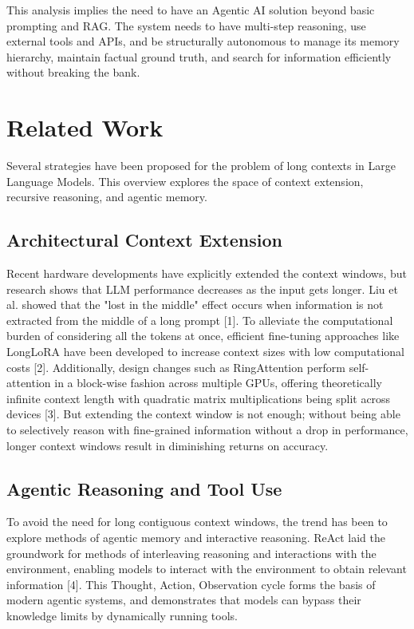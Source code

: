 \documentclass[conference]{IEEEtran}
\begin{document}
This analysis implies the need to have an Agentic AI solution beyond basic prompting and RAG. The system needs to have multi-step reasoning, use external tools and APIs, and be structurally autonomous to manage its memory hierarchy, maintain factual ground truth, and search for information efficiently without breaking the bank.

\section{Related Work}
Several strategies have been proposed for the problem of long contexts in Large Language Models. This overview explores the space of context extension, recursive reasoning, and agentic memory.

\subsection{Architectural Context Extension}
Recent hardware developments have explicitly extended the context windows, but research shows that LLM performance decreases as the input gets longer. Liu et al. showed that the "lost in the middle" effect occurs when information is not extracted from the middle of a long prompt [1]. To alleviate the computational burden of considering all the tokens at once, efficient fine-tuning approaches like LongLoRA have been developed to increase context sizes with low computational costs [2]. Additionally, design changes such as RingAttention perform self-attention in a block-wise fashion across multiple GPUs, offering theoretically infinite context length with quadratic matrix multiplications being split across devices [3]. But extending the context window is not enough; without being able to selectively reason with fine-grained information without a drop in performance, longer context windows result in diminishing returns on accuracy.

\subsection{Agentic Reasoning and Tool Use}
To avoid the need for long contiguous context windows, the trend has been to explore methods of agentic memory and interactive reasoning. ReAct laid the groundwork for methods of interleaving reasoning and interactions with the environment, enabling models to interact with the environment to obtain relevant information [4]. This Thought, Action, Observation cycle forms the basis of modern agentic systems, and demonstrates that models can bypass their knowledge limits by dynamically running tools.
\end{document}
